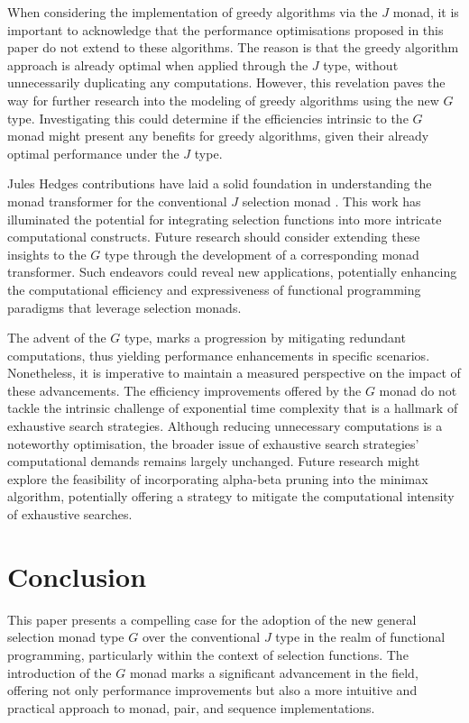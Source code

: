 \documentclass[runningheads]{llncs}
\begin{document}
\qquad When considering the implementation of greedy algorithms via the
\(J\) monad, it is important to acknowledge that the performance
optimisations proposed in this paper do not extend to these algorithms.
The reason is that the greedy algorithm approach is already optimal when
applied through the \(J\) type, without unnecessarily duplicating any
computations. However, this revelation paves the way for further
research into the modeling of greedy algorithms using the new \(G\)
type. Investigating this could determine if the efficiencies intrinsic
to the \(G\) monad might present any benefits for greedy algorithms,
given their already optimal performance under the \(J\) type.

\qquad Jules Hedges contributions have laid a solid foundation in
understanding the monad transformer for the conventional \(J\) selection
monad \cite{hedges2014monad}. This work has illuminated the potential
for integrating selection functions into more intricate computational
constructs. Future research should consider extending these insights to
the \(G\) type through the development of a corresponding monad
transformer. Such endeavors could reveal new applications, potentially
enhancing the computational efficiency and expressiveness of functional
programming paradigms that leverage selection monads.

\qquad The advent of the \(G\) type, marks a progression by mitigating
redundant computations, thus yielding performance enhancements in
specific scenarios. Nonetheless, it is imperative to maintain a measured
perspective on the impact of these advancements. The efficiency
improvements offered by the \(G\) monad do not tackle the intrinsic
challenge of exponential time complexity that is a hallmark of
exhaustive search strategies. Although reducing unnecessary computations
is a noteworthy optimisation, the broader issue of exhaustive search
strategies' computational demands remains largely unchanged. Future
research might explore the feasibility of incorporating alpha-beta
pruning into the minimax algorithm, potentially offering a strategy to
mitigate the computational intensity of exhaustive searches.

\section{Conclusion}\label{conclusion}

This paper presents a compelling case for the adoption of the new
general selection monad type \(G\) over the conventional \(J\) type in
the realm of functional programming, particularly within the context of
selection functions. The introduction of the \(G\) monad marks a
significant advancement in the field, offering not only performance
improvements but also a more intuitive and practical approach to monad,
pair, and sequence implementations.
\end{document}
